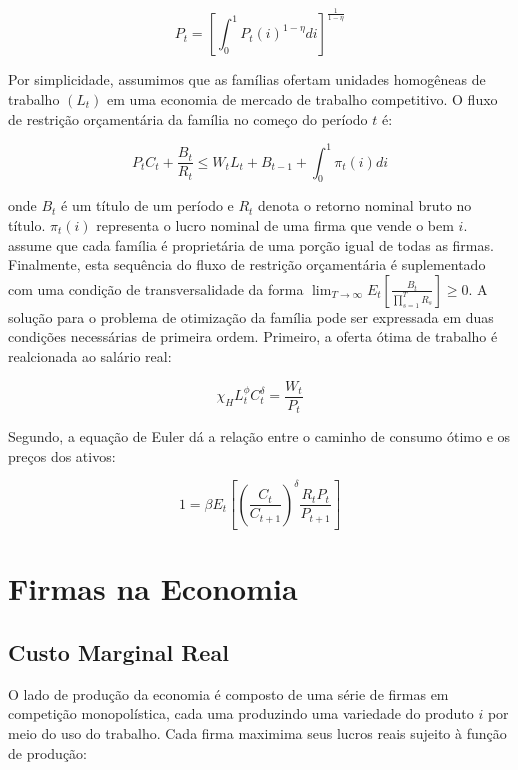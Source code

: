 \documentclass[twoside,a4paper,11pt]{report}
\begin{document}
\begin{equation}\label{eq04en02}
{P}_{t}={[\int _{0}^{1}{{P}_{t}{(i)}^{1-\eta}}di]}^{\frac{1}{1-\eta}}
\end{equation}

Por simplicidade, assumimos que as famílias ofertam unidades homogêneas de trabalho $(L_{t})$ em uma economia de mercado de trabalho competitivo. O fluxo de restrição orçamentária da família no começo do período $t$ é:

\begin{equation}\label{eq05en02}
{P}_{t}{C}_{t}+\frac{{B}_{t}}{{R}_{t}}\le{W}_{t}{L}_{t}+{B}_{t-1}+\int _{0}^{1}{{\pi}_{t}(i)di} 
\end{equation}

\noindent onde ${B}_{t}$ é um título de um período e $R_{t}$ denota o retorno nominal bruto no título. ${\pi}_{t}(i)$ representa o lucro nominal de uma firma que vende o bem $i$. \citet{yao2010aggregate} assume que cada família é proprietária de uma porção igual de todas as firmas. Finalmente, esta sequência do fluxo de restrição orçamentária é suplementado com uma condição de transversalidade da forma $\lim _{T\rightarrow \infty}{{E}_{t}[\frac{{B}_{t}}{\prod _{s=1}^{T}{R_{s}}}]} \ge 0$. A solução para o problema de otimização da família pode ser expressada em duas condições necessárias de primeira ordem. Primeiro, a oferta ótima de trabalho é realcionada ao salário real:

\begin{equation}\label{eq06en02}
{\chi}_{H}{L}_{t}^{\phi}{C}_{t}^{\delta}=\frac{{W}_{t}}{{P}_{t}} 
\end{equation}

Segundo, a equação de Euler dá a relação entre o caminho de consumo ótimo e os preços dos ativos:

\begin{equation}\label{eq07en02}
1=\beta {E}_{t}[{(\frac{{C}_{t}}{{C}_{t+1}})}^{\delta}\frac{{R}_{t}{P}_{t}}{{P}_{t+1}}] 
\end{equation}


\section*{Firmas na Economia}

\subsection*{Custo Marginal Real}

O lado de produção da economia é composto de uma série de firmas em competição monopolística, cada uma produzindo uma variedade do produto $i$ por meio do uso do trabalho. Cada firma maximima seus lucros reais sujeito à função de produção:
\end{document}
